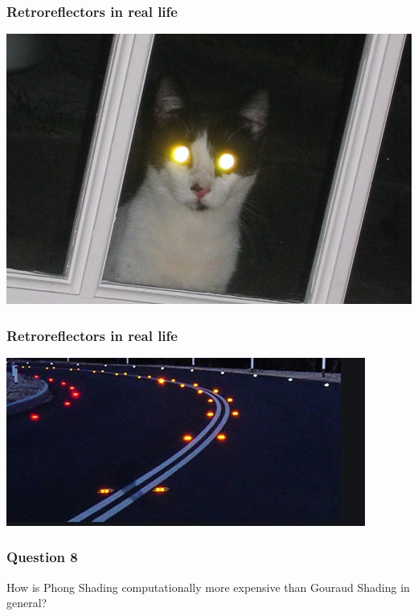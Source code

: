 \documentclass{beamer}
\begin{document}
\begin{frame}
    \frametitle{Retroreflectors in real life}

    \begin{center}
        \includegraphics[scale=0.6]{cat-eye.jpg}
    \end{center}

\end{frame}

\begin{frame}
    \frametitle{Retroreflectors in real life}

    \begin{center}
        \includegraphics[scale=0.7]{road-cat-eye.png}
    \end{center}

\end{frame}

\begin{frame}
    \frametitle{Question 8}

    How is Phong Shading computationally more expensive than Gouraud Shading in general?

\end{frame}
\end{document}
